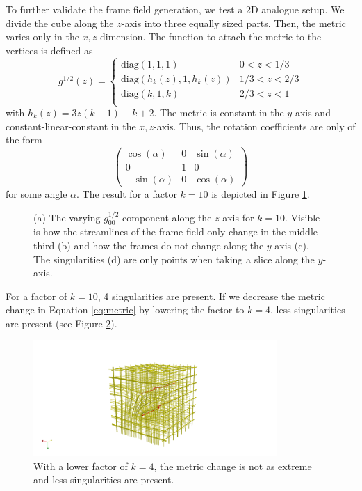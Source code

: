 \documentclass[../thesis.tex]{subfiles}
\begin{document}
To further validate the frame field generation, we test a 2D analogue setup.
We divide the cube along
the $z$-axis into three equally sized parts.
Then, the metric varies only in the $x,z$-dimension.
The function to attach the metric to the vertices is defined as
\begin{equation}\label{eq:metric}
g^{1/2}(z) = \begin{cases}
    \mathrm{diag}(1,1,1) &0 < z < 1/3 \\
    \mathrm{diag}(h_k(z),1,h_k(z)) &1/3 < z < 2/3 \\
    \mathrm{diag}(k,1,k) &2/3 < z < 1 \\
\end{cases}\end{equation}
with $h_k(z)=3z(k-1)-k+2$.
The metric is constant in the $y$-axis and constant-linear-constant in the $x,z$-axis.
Thus, the rotation coefficients are only of the form
$$\begin{pmatrix}
    \cos (\alpha) & 0 & \sin(\alpha) \\
    0 & 1 & 0 \\
    -\sin(\alpha) & 0 & \cos(\alpha)
\end{pmatrix}$$
for some angle $\alpha$.
The result for a factor $k=10$ is depicted in Figure \ref{fig:image2}.
\begin{figure}[htb]
    \centering
    \def\svgwidth{\textwidth}
    
    \caption{(a) The varying $g^{1/2}_{00}$ component along the $z$-axis for $k=10$. Visible is how
    the streamlines of the frame field only change in the middle third (b) and how the frames do not change along the $y$-axis (c).
    The singularities (d) are only points when taking a slice along the $y$-axis.}
    \label{fig:image2}
\end{figure}
For a factor of ${k=10}$, 4 singularities are present.
If we decrease the metric change in Equation \ref{eq:metric} by
lowering the factor to $k=4$, less singularities are present (see Figure \ref{fig:image3}).
\begin{figure}[htb]
    \centering
    \includegraphics[width=25em]{figures/image3}
    \caption{With a lower factor of $k=4$, the metric change is not as extreme and less singularities are present.}
    \label{fig:image3}
\end{figure}
\end{document}
